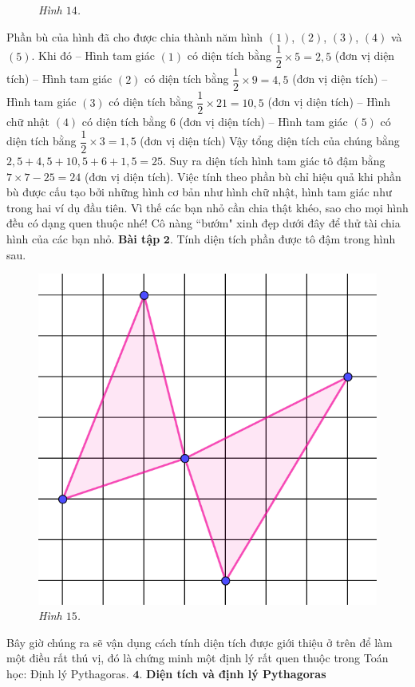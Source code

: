 \begin{multicols}{2}
\begin{figure}[H]
		\caption{\small\textit{\color{toancuabi}Hình $14$.}}
		\vspace*{-10pt}
	\end{figure}
	Phần bù của hình đã cho được chia thành năm hình $(1)$, $(2)$, $(3)$, $(4)$ và $(5)$. Khi đó
	\vskip 0.1cm
	-- Hình tam giác $(1)$ có diện tích bằng $\dfrac{1}{2}\times 5=2{,}5$ (đơn vị diện tích)
	\vskip 0.1cm
	-- Hình tam giác $(2)$ có diện tích bằng $\dfrac{1}{2}\times 9=4{,}5$ (đơn vị diện tích)
	\vskip 0.1cm
	-- Hình tam giác $(3)$ có diện tích bằng $\dfrac{1}{2}\times 21=10{,}5$ (đơn vị diện tích)
	\vskip 0.1cm
	-- Hình chữ nhật $(4)$ có diện tích bằng $6$ (đơn vị diện tích)
	\vskip 0.1cm
	-- Hình tam giác $(5)$ có diện tích bằng $\dfrac{1}{2}\times 3=1{,}5$ (đơn vị diện tích)
	\vskip 0.1cm
	Vậy tổng diện tích của chúng bằng $2{,}5+4{,}5+10{,}5+6+1{,}5 =25$. Suy ra diện tích hình tam giác tô đậm bằng $7\times 7-25=24$ (đơn vị diện tích). 
	\vskip 0.1cm
	Việc tính theo phần bù chỉ hiệu quả khi phần bù được cấu tạo bởi những hình cơ bản như hình chữ nhật, hình tam giác như trong hai ví dụ đầu tiên. Vì thế các bạn nhỏ cần chia thật khéo, sao cho mọi hình đều có dạng quen thuộc nhé!  
	\vskip 0.1cm
	Cô nàng ``bướm" xinh đẹp dưới đây để thử tài chia hình của các bạn nhỏ.
	\vskip 0.1cm
	\textbf{\color{toancuabi}Bài tập} $\pmb{2.}$ Tính diện tích phần được tô đậm trong hình sau.
	\begin{figure}[H]
		\centering
		\vspace*{-5pt}
		\captionsetup{labelformat= empty, justification=centering}
		\includegraphics[width=0.5\linewidth]{15}
		\caption{\small\textit{\color{toancuabi}Hình $15$.}}
		\vspace*{-10pt}
	\end{figure}
	Bây giờ chúng ra sẽ vận dụng cách tính diện tích được giới thiệu ở trên để làm một điều rất thú vị, đó là chứng minh một định lý rất quen thuộc trong Toán học: Định lý Pythagoras.
	\vskip 0.1cm
	$\pmb{4.}$ \textbf{\color{toancuabi}Diện tích và định lý Pythagoras}

\end{multicols}
